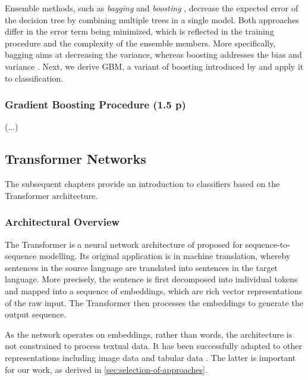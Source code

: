 Ensemble methods, such as \emph{bagging} \autocite[][123]{breimanBaggingPredictors1996} and \emph{boosting} \autocite[][197--227]{schapireStrengthWeakLearnability1990}, decrease the expected error of the decision tree by combining multiple trees in a single model. Both approaches differ in the error term being minimized, which is reflected in the training procedure and the complexity of the ensemble members. More specifically, bagging aims at decreasing the variance, whereas boosting addresses the bias and variance \autocites[][1672]{schapireBoostingMarginNew1998}[][29]{breimanRandomForests2001}. Next, we derive \gls{GBM}, a variant of boosting introduced by \textcite[][9]{friedmanGreedyFunctionApproximation2001} and apply it to classification.

\subsubsection{Gradient Boosting
    Procedure (1.5 p)}\label{sec:gradient-boosting-procedure}
(...)

\subsection{Transformer Networks}\label{sec:transformer-networks}

The subsequent chapters provide an introduction to classifiers based on the Transformer architecture.

\subsubsection{Architectural Overview}\label{sec:architectural-overview}

The Transformer is a neural network architecture of \textcite[][6002--6006]{vaswaniAttentionAllYou2017} proposed for sequence-to-sequence modelling. Its original application is in machine translation, whereby sentences in the source language are translated into sentences in the target language. More precisely, the sentence is first decomposed into individual \glspl{token} and mapped into a sequence of \glspl{embedding}, which are rich vector representations of the raw input. The Transformer then processes the \glspl{embedding} to generate the output sequence.

As the network operates on \glspl{embedding}, rather than words, the architecture is not constrained to process textual data. It has been successfully adapted to other representations including image data \autocites[][2--5]{parmarImageTransformer2018}[][3]{dosovitskiyImageWorth16x162021} and tabular data \autocite[cp.][18932]{gorishniyRevisitingDeepLearning2021}. The latter is important for our work, as derived in \cref{sec:selection-of-approaches}.


